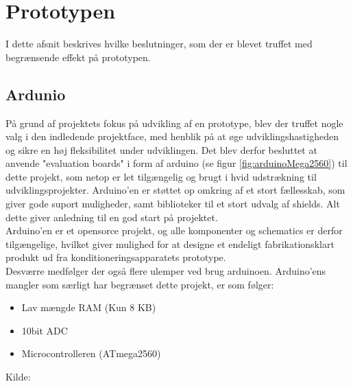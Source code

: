 \section{Prototypen}
I dette afsnit beskrives hvilke beslutninger, som der er blevet truffet med begrænsende effekt på prototypen.

\subsection{Ardunio}
\begin{minipage}[t]{0.6\textwidth}
På grund af projektets fokus på udvikling af en prototype, blev der truffet nogle valg i den indledende projektface, med henblik på at øge udviklingshastigheden og sikre en høj fleksibilitet under udviklingen. Det blev derfor besluttet at anvende "evaluation boards" i form af arduino (se figur \ref{fig:arduinoMega2560}) til dette projekt, som netop er let tilgængelig og brugt i hvid udstrækning til udviklingsprojekter. Arduino'en er støttet op omkring af et stort fællesskab, som giver gode suport muligheder, samt biblioteker til et stort udvalg af shields. Alt dette giver anledning til en god start på projektet.\\

Arduino'en er et opensorce projekt, og alle komponenter og schematics er derfor tilgængelige, hvilket giver mulighed for at designe et endeligt fabrikationsklart produkt ud fra konditioneringsapparatets prototype.\\

Desværre medfølger der også flere ulemper ved brug arduinoen. Arduino'ens mangler som særligt har begrænset dette projekt, er som følger:\\

\begin{itemize}
	\item Lav mængde RAM (Kun 8 KB) 
	\item 10bit ADC
	\item Microcontrolleren (ATmega2560)
\end{itemize}
Kilde: \cite{RefWorks:40}

\end{minipage}
